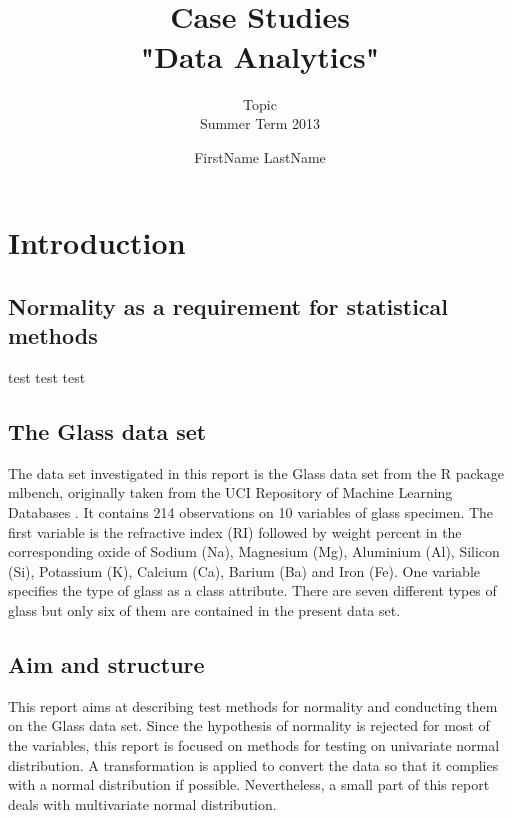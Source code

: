 \documentclass[a4paper, 12pt, titlepage, headsepline, listof = totoc, bibliography = totoc, numbers = noenddot]{scrartcl}
\title{\hrulefill \\ \vspace*{1cm} Case Studies\\\vspace*{0.5cm}
 "Data Analytics" \\ \vspace*{1cm}\hrulefill\vspace*{1.5cm}}
\subtitle{Topic\\\vspace*{1.5cm} Summer Term 2013\vspace*{1.5cm}}
\author{FirstName LastName}
\begin{document}

\thispagestyle{empty}
\maketitle


\thispagestyle{empty}
\tableofcontents


\newpage
\setcounter{page}{1}
\section{Introduction}

\subsection{Normality as a requirement for statistical methods}

test test test

\subsection{The Glass data set}

The data set investigated in this report is the Glass data set from the R package mlbench, originally taken from the UCI Repository of Machine Learning Databases \cite{uci}. It contains 214 observations on 10 variables of glass specimen. The first variable is the refractive index (RI) followed by weight percent in the corresponding oxide of Sodium (Na), Magnesium (Mg), Aluminium (Al), Silicon (Si), Potassium (K), Calcium (Ca), Barium (Ba) and Iron (Fe). One variable specifies the type of glass as a class attribute. There are seven different types of glass but only six of them are contained in the present data set.

\subsection{Aim and structure}

This report aims at describing test methods for normality and conducting them on the Glass data set. Since the hypothesis of normality is rejected for most of the variables, this report is focused on methods for testing on univariate normal distribution. A transformation is applied to convert the data so that it complies with a normal distribution if possible. Nevertheless, a small part of this report deals with multivariate normal distribution.
\end{document}

